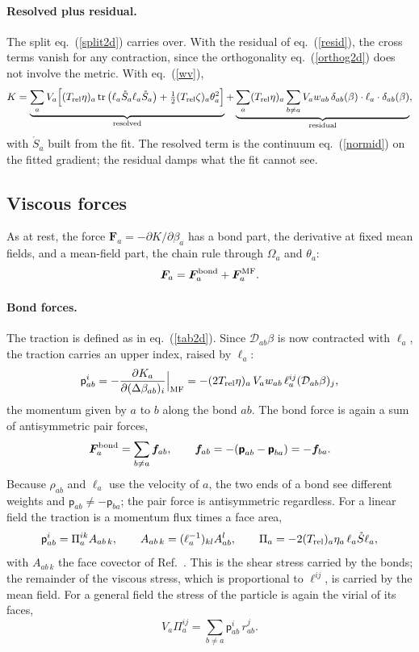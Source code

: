\documentclass[11pt,aps,preprint,nofootinbib,superscriptaddress,tightenlines]{revtex4-2}
\def\st{\begin{equation}}
\def\stp{\end{equation}}
\def\Eq#1{eq.~(\ref{#1})}
\providecommand{\tr}{\operatorname{tr}}
\newcommand{\pf}{\bm{\mathsf p}}
\let\oldparagraph\paragraph
\renewcommand{\paragraph}{\par\bigskip\oldparagraph}
\begin{document}
\paragraph{Resolved plus residual.}  The split \Eq{split2d} carries over.  With
the residual of \Eq{resid}, the cross terms vanish for any contraction, since the
orthogonality \Eq{orthog2d} does not involve the metric.  With \Eq{wv},
\st
K=\underbrace{\sum_aV_a\Big[(T_{\rm rel}\eta)_a\tr\big(\ell_a\mathring S_a\ell_a\mathring S_a\big)+\tfrac12(T_{\rm rel}\zeta)_a\theta_a^2\Big]}_{\text{resolved}}
+\underbrace{\sum_a(T_{\rm rel}\eta)_a\sum_{b\neq a}V_aw_{ab}\,\delta_{ab}(\beta)\cdot\ell_a\cdot\delta_{ab}(\beta)}_{\text{residual}} ,
\stp
with $\mathring S_a$ built from the fit.  The resolved term is the continuum
\Eq{normid} on the fitted gradient; the residual damps what the fit cannot
see.

\subsection{Viscous forces}
\label{sec:forcev}

As at rest, the force $\bm F_a=-\partial K/\partial\beta_a$ has a bond part, the
derivative at fixed mean fields, and a mean-field part, the chain rule through
$\Omega_a$ and $\theta_a$:
\st
\bm F_a=\bm F_a^{\rm bond}+\bm F_a^{\rm MF} .
\stp

\paragraph{Bond forces.}  The traction is defined as in \Eq{tab2d}.  Since
$\mathcal D_{ab}\beta$ is now contracted with $\ell_a$, the traction carries an
upper index, raised by $\ell_a$:
\st
\mathsf p^i_{ab}=-\frac{\partial K_a}{\partial(\Delta\beta_{ab})_i}\Big|_{\rm MF}
=-(2T_{\rm rel}\eta)_a\,V_aw_{ab}\,\ell_a^{ij}(\mathcal D_{ab}\beta)_j ,
\label{tabv}
\stp
the momentum given by $a$ to $b$ along the bond $ab$.  The bond force is again
a sum of antisymmetric pair forces,
\st
\bm F_a^{\rm bond}=\sum_{b\neq a}\bm f_{ab},\qquad
\bm f_{ab}=-(\pf_{ab}-\pf_{ba})=-\bm f_{ba} .
\stp
Because $\rho_{ab}$ and $\ell_a$ use the velocity of $a$, the two ends of a bond
see different weights and $\pf_{ab}\neq-\pf_{ba}$; the pair force is
antisymmetric regardless.  For a linear field the traction is a momentum flux
times a face area,
\st
\mathsf p^i_{ab}=\Pi_a^{ik}A_{ab\,k},\qquad
A_{ab\,k}=(\ell_a^{-1})_{kl}A^l_{ab},\qquad
\Pi_a=-2(T_{\rm rel})_a\eta_a\,\ell_a\mathring S\ell_a ,
\stp
with $A_{ab\,k}$ the face covector of Ref.~\cite{ParticleMetrics}.  This is the
shear stress carried by the bonds; the remainder of the viscous stress, which is
proportional to $\ell^{ij}$, is carried by the mean field.  For a general field the stress of the particle is
again the virial of its faces,
\st
V_a\Pi_a^{ij}=\sum_{b\neq a}\mathsf p^i_{ab}\,r^j_{ab} .
\label{virialv}
\stp
\end{document}
